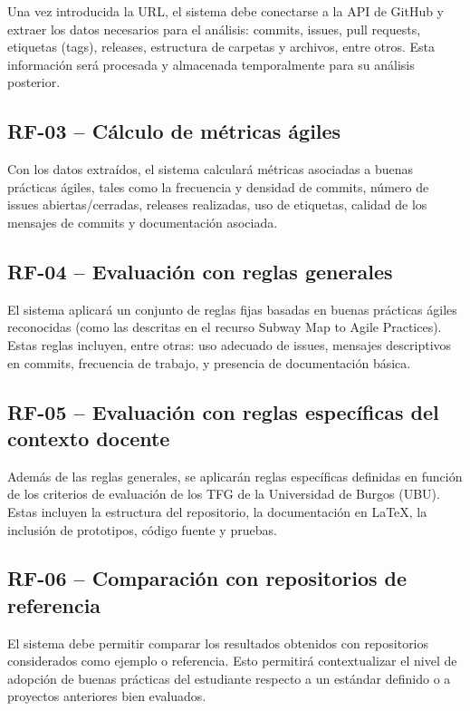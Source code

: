 Una vez introducida la URL, el sistema debe conectarse a la API de GitHub y extraer los datos necesarios para el análisis: commits, issues, pull requests, etiquetas (tags), releases, estructura de carpetas y archivos, entre otros. Esta información será procesada y almacenada temporalmente para su análisis posterior.

\subsection*{RF-03 – Cálculo de métricas ágiles}

Con los datos extraídos, el sistema calculará métricas asociadas a buenas prácticas ágiles, tales como la frecuencia y densidad de commits, número de issues abiertas/cerradas, releases realizadas, uso de etiquetas, calidad de los mensajes de commits y documentación asociada.

\subsection*{RF-04 – Evaluación con reglas generales}

El sistema aplicará un conjunto de reglas fijas basadas en buenas prácticas ágiles reconocidas (como las descritas en el recurso Subway Map to Agile Practices). Estas reglas incluyen, entre otras: uso adecuado de issues, mensajes descriptivos en commits, frecuencia de trabajo, y presencia de documentación básica.

\subsection*{RF-05 – Evaluación con reglas específicas del contexto docente}

Además de las reglas generales, se aplicarán reglas específicas definidas en función de los criterios de evaluación de los TFG de la Universidad de Burgos (UBU). Estas incluyen la estructura del repositorio, la documentación en LaTeX, la inclusión de prototipos, código fuente y pruebas.

\subsection*{RF-06 – Comparación con repositorios de referencia}

El sistema debe permitir comparar los resultados obtenidos con repositorios considerados como ejemplo o referencia. Esto permitirá contextualizar el nivel de adopción de buenas prácticas del estudiante respecto a un estándar definido o a proyectos anteriores bien evaluados.

